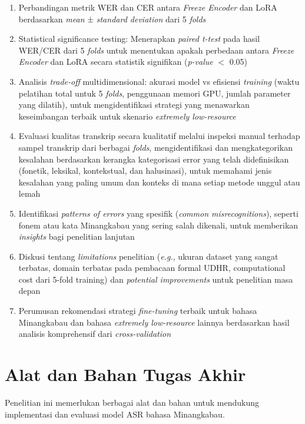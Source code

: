 \begin{enumerate}[noitemsep]
    \item Perbandingan metrik WER dan CER antara \textit{Freeze Encoder} dan LoRA berdasarkan \textit{mean} ± \textit{standard deviation} dari 5 \textit{folds}
    \item Statistical significance testing: Menerapkan \textit{paired t-test} \cite{student1908ttest} pada hasil WER/CER dari 5 \textit{folds} untuk menentukan apakah perbedaan antara \textit{Freeze Encoder} dan LoRA secara statistik signifikan (\textit{p-value} $<$ 0.05)
    \item Analisis \textit{trade-off} multidimensional: akurasi model vs efisiensi \textit{training} (waktu pelatihan total untuk 5 \textit{folds}, penggunaan memori GPU, jumlah parameter yang dilatih), untuk mengidentifikasi strategi yang menawarkan keseimbangan terbaik untuk skenario \textit{extremely low-resource}
    \item Evaluasi kualitas transkrip secara kualitatif melalui inspeksi manual terhadap sampel transkrip dari berbagai \textit{folds}, mengidentifikasi dan mengkategorikan kesalahan berdasarkan kerangka kategorisasi error yang telah didefinisikan (fonetik, leksikal, kontekstual, dan halusinasi), untuk memahami jenis kesalahan yang paling umum dan konteks di mana setiap metode unggul atau lemah
    \item Identifikasi \textit{patterns of errors} yang spesifik (\textit{common misrecognitions}), seperti fonem atau kata Minangkabau yang sering salah dikenali, untuk memberikan \textit{insights} bagi penelitian lanjutan
    \item Diskusi tentang \textit{limitations} penelitian (\textit{e.g.}, ukuran dataset yang sangat terbatas, domain terbatas pada pembacaan formal UDHR, computational cost dari 5-fold training) dan \textit{potential improvements} untuk penelitian masa depan
    \item Perumusan rekomendasi strategi \textit{fine-tuning} terbaik untuk bahasa Minangkabau dan bahasa \textit{extremely low-resource} lainnya berdasarkan hasil analisis komprehensif dari \textit{cross-validation}
\end{enumerate}

\section{Alat dan Bahan Tugas Akhir}
\label{III.Alat dan Bahan}

Penelitian ini memerlukan berbagai alat dan bahan untuk mendukung implementasi dan evaluasi model ASR bahasa Minangkabau.

